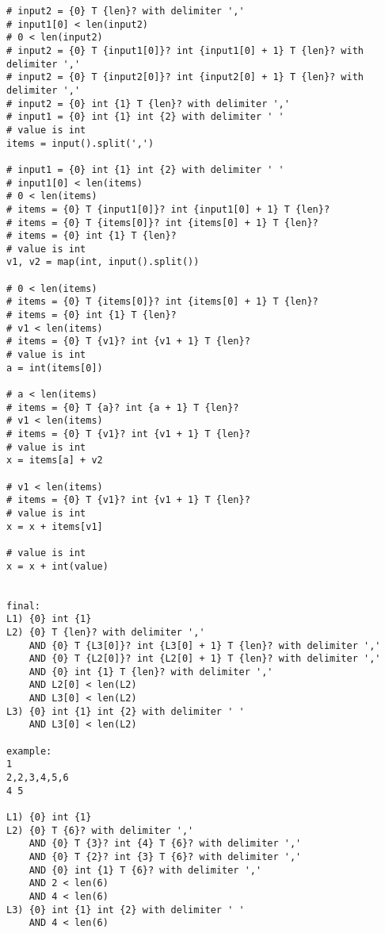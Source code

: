 \documentclass[11pt]{article}
\begin{document}
\begin{itemize}
\begin{lstlisting}[numbers=none]
# input2 = {0} T {len}? with delimiter ','
# input1[0] < len(input2)
# 0 < len(input2)
# input2 = {0} T {input1[0]}? int {input1[0] + 1} T {len}? with delimiter ','
# input2 = {0} T {input2[0]}? int {input2[0] + 1} T {len}? with delimiter ','
# input2 = {0} int {1} T {len}? with delimiter ','
# input1 = {0} int {1} int {2} with delimiter ' ' 
# value is int
items = input().split(',')

# input1 = {0} int {1} int {2} with delimiter ' ' 
# input1[0] < len(items)
# 0 < len(items)
# items = {0} T {input1[0]}? int {input1[0] + 1} T {len}?
# items = {0} T {items[0]}? int {items[0] + 1} T {len}?
# items = {0} int {1} T {len}?
# value is int
v1, v2 = map(int, input().split())

# 0 < len(items)
# items = {0} T {items[0]}? int {items[0] + 1} T {len}?
# items = {0} int {1} T {len}?
# v1 < len(items)
# items = {0} T {v1}? int {v1 + 1} T {len}?
# value is int
a = int(items[0])

# a < len(items)
# items = {0} T {a}? int {a + 1} T {len}?
# v1 < len(items)
# items = {0} T {v1}? int {v1 + 1} T {len}?
# value is int
x = items[a] + v2

# v1 < len(items)
# items = {0} T {v1}? int {v1 + 1} T {len}?
# value is int
x = x + items[v1]

# value is int
x = x + int(value)


final:
L1) {0} int {1}
L2) {0} T {len}? with delimiter ',' 
    AND {0} T {L3[0]}? int {L3[0] + 1} T {len}? with delimiter ',' 
    AND {0} T {L2[0]}? int {L2[0] + 1} T {len}? with delimiter ',' 
    AND {0} int {1} T {len}? with delimiter ',' 
    AND L2[0] < len(L2)
    AND L3[0] < len(L2)
L3) {0} int {1} int {2} with delimiter ' '
    AND L3[0] < len(L2)
    
example:
1
2,2,3,4,5,6
4 5

L1) {0} int {1}
L2) {0} T {6}? with delimiter ',' 
    AND {0} T {3}? int {4} T {6}? with delimiter ',' 
    AND {0} T {2}? int {3} T {6}? with delimiter ',' 
    AND {0} int {1} T {6}? with delimiter ',' 
    AND 2 < len(6)
    AND 4 < len(6)
L3) {0} int {1} int {2} with delimiter ' '
    AND 4 < len(6)


\end{lstlisting}


\end{itemize}
\end{document}
